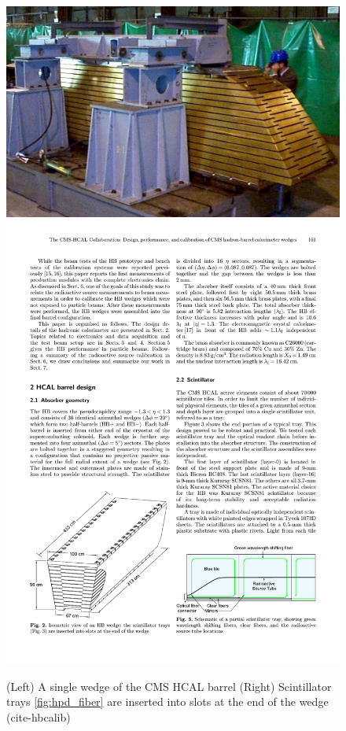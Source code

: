 \begin{figure}
\begin{center}
\includegraphics[width=.45\textwidth]{pics/hb_wedge}
\includegraphics[width=.45\textwidth]{pics/HBwedge}
\end{center}
\caption{(Left) A single wedge of the CMS HCAL barrel (Right) Scintillator trays \ref{fig:hpd_fiber} are inserted into slots at the end of the wedge (cite-hbcalib)}
\label{fig:hb_wedge}
\end{figure}

